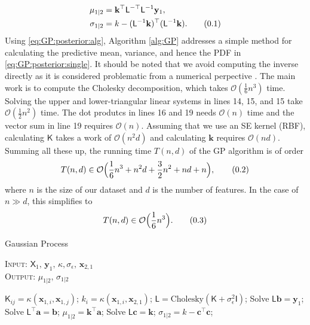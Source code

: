 \documentclass[10pt]{article}
\theoremstyle{definition}
\newcommand\eqnum{\addtocounter{equation}{1}\tag{\arabic{section}.\arabic{equation}}}
\begin{document}
\begin{align*}
\mu_{1|2}  &= \mathbf{k}^{\top}\mathsf{L}^{-\top}\mathsf{L}^{-1}\mathbf{y}_1, \\
\sigma_{1|2} &= k - (\mathsf{L}^{-1}\mathbf{k})^{\top}(\mathsf{L}^{-1}\mathbf{k}).
\eqnum
\label{eq:GP:posterior:alg}
\end{align*}
Using \cref{eq:GP:posterior:alg}, Algorithm \ref{alg:GP} addresses a simple method for calculating the predictive mean, variance, and hence the PDF in \eqref{eq:GP:posterior:single}.  It should be noted that we avoid computing the inverse directly as it is considered problematic from a numerical perpective \cite[Section 4.7]{Gill1991}. The main work is to compute the Cholesky decomposition, which takes $\mathcal{O}(\frac{1}{6}n^3)$ time. Solving the upper and lower-triangular linear systems in lines 14, 15, and 15 take $\mathcal{O}(\frac{1}{2}n^2)$ time. The dot produtcs in lines 16 and 19 needs $\mathcal{O}(n)$ time and the vector sum in line 19 requires $\mathcal{O}(n)$. Assuming that we use an SE kernel (RBF), calculating $\mathsf{K}$ takes a work of $\mathcal{O}(n^2d)$ and calculating $\mathbf{k}$ requires $\mathcal{O}(nd)$. Summing all these up, the running time $T(n,d)$ of the GP algorithm is of order
\begin{equation*}
T(n,d) \in \mathcal{O}\Big(\frac{1}{6}n^3+n^2d+\frac{3}{2}n^2+nd+n\Big),
\eqnum
\end{equation*}
where $n$ is the size of our dataset and $d$ is the number of features. In the case of $n \gg d$, this simplifies to
\begin{equation*}
T(n,d) \in \mathcal{O}\Big(\frac{1}{6}n^3\Big).
\eqnum
\end{equation*}
\begin{algorithm}[t!]
\caption{Gaussian Process}\label{alg:GP}
\hspace*{\algorithmicindent} {\scshape Input}: $\mathsf{X}_1, \, \mathbf{y}_1, \, \kappa, \sigma_{\epsilon}, \, \mathbf{x}_{2,1}$ \\
\hspace*{\algorithmicindent} {\scshape Output}: $\mu_{1|2}, \, \sigma_{1|2}$
\begin{algorithmic}[1]
        \State $\mathsf{K}_{ij} = \kappa(\mathbf{x}_{1,i},\mathbf{x}_{1,j})$;
    \EndFor
\EndFor
{}
    \State $k_{i} = \kappa(\mathbf{x}_{1,i},\mathbf{x}_{2,1})$;
\EndFor
{}
\State $\mathsf{L}=\text{Cholesky}(\mathsf{K}+\sigma_{\epsilon}^2\mathsf{I})$;
\State Solve $\mathsf{L} \mathbf{b} = \mathbf{y}_1$;
\State Solve $\mathsf{L}^{\top} \mathbf{a} = \mathbf{b}$;
\State $\mu_{1|2} = \mathbf{k}^{\top}\mathbf{a}$;
\State Solve $\mathsf{L} \mathbf{c} = \mathbf{k}$;
\State $\sigma_{1|2}=k-\mathbf{c}^{\top}\mathbf{c}$;
\end{algorithmic}
\end{algorithm}
\end{document}
